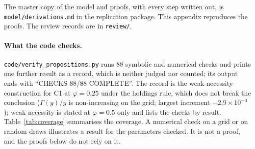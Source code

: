 \documentclass[12pt]{article}
\theoremstyle{remark}
\begin{document}
The master copy of the model and proofs, with every step written out, is \texttt{model/derivations.md} in the replication package. This appendix reproduces the proofs. The review records are in \texttt{review/}.

\paragraph{What the code checks.} \texttt{code/verify\_propositions.py} runs 88 symbolic and numerical checks and prints one further result as a record, which is neither judged nor counted; its output ends with ``CHECKS 88/88 COMPLETE''. The record is the weak-necessity construction for C1 at $\varphi=0.25$ under the holdings rule, which does not break the conclusion ($\Gamma(y)/y$ is non-increasing on the grid; largest increment $-2.9\times10^{-4}$); weak necessity is stated at $\varphi=0.5$ only and lists the checks by result. Table~\ref{tab:coverage} summarises the coverage. A numerical check on a grid or on random draws illustrates a result for the parameters checked. It is not a proof, and the proofs below do not rely on it.
\end{document}
